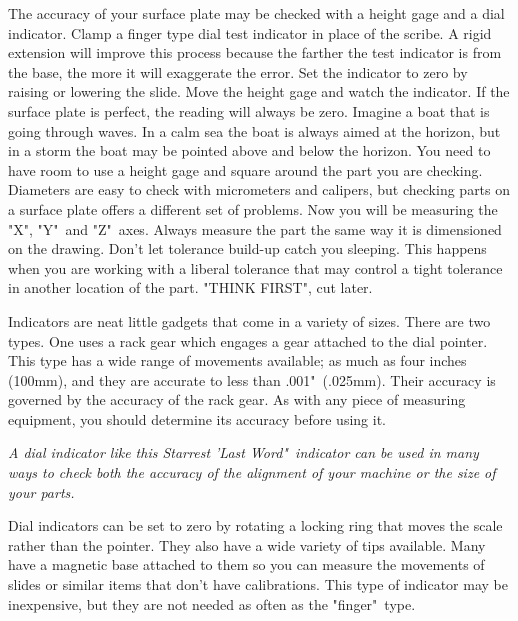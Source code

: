 The accuracy of your surface plate may be checked with a height gage and a dial
indicator. Clamp a finger type dial test indicator in place of the scribe. A
rigid extension will improve this process because the farther the test indicator
is from the base, the more it will exaggerate the error. Set the indicator to
zero by raising or lowering the slide. Move the height gage and watch the
indicator. If the surface plate is perfect, the reading will always be zero.
Imagine a boat that is going through waves. In a calm sea the boat is always
aimed at the horizon, but in a storm the boat may be pointed above and below the
horizon. You need to have room to use a height gage and square around the part
you are checking. Diameters are easy to check with micrometers and calipers, but
checking parts on a surface plate offers a different set of problems. Now you
will be measuring the "X", "Y"\ and "Z"\ axes. Always measure the part the same
way it is dimensioned on the drawing. Don't let tolerance build-up catch you
sleeping. This happens when you are working with a liberal tolerance that may
control a tight tolerance in another location of the part. "THINK FIRST", cut
later.


Indicators are neat little gadgets that come in a variety of sizes. There are
two types. One uses a rack gear which engages a gear attached to the dial
pointer. This type has a wide range of movements available; as much as four
inches (100mm), and they are accurate to less than .001"\ (.025mm). Their
accuracy is governed by the accuracy of the rack gear. As with any piece of
measuring equipment, you should determine its accuracy before using it.

\bigskip
\textit{A dial indicator like this Starrest 'Last Word"\ indicator can be used in
many ways to check both the accuracy of the alignment of your machine or the
size of your parts.}
\bigskip

Dial indicators can be set to zero by rotating a locking ring that moves the
scale rather than the pointer. They also have a wide variety of tips available.
Many have a magnetic base attached to them so you can measure
the movements of slides or similar items that don't have calibrations. This type
of indicator may be inexpensive, but they are not needed as often as the
"finger"\ type.

